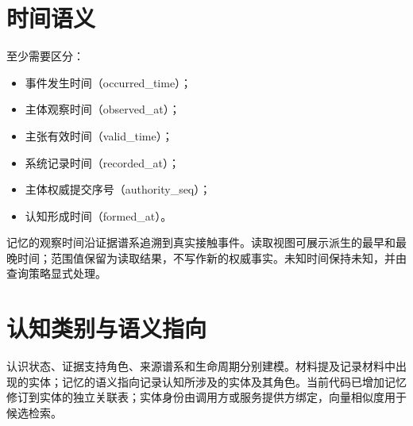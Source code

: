 \section{时间语义}

至少需要区分：

\begin{itemize}
\item 事件发生时间（occurred\allowbreak\_time）；
\item 主体观察时间（observed\allowbreak\_at）；
\item 主张有效时间（valid\allowbreak\_time）；
\item 系统记录时间（recorded\allowbreak\_at）；
\item 主体权威提交序号（authority\allowbreak\_seq）；
\item 认知形成时间（formed\allowbreak\_at）。
\end{itemize}

记忆的观察时间沿证据谱系追溯到真实接触事件。读取视图可展示派生的最早和最晚时间；范围值保留为读取结果，不写作新的权威事实。未知时间保持未知，并由查询策略显式处理。

\section{认知类别与语义指向}

认识状态、证据支持角色、来源谱系和生命周期分别建模。材料提及记录材料中出现的实体；记忆的语义指向记录认知所涉及的实体及其角色。当前代码已增加记忆修订到实体的独立关联表；实体身份由调用方或服务提供方绑定，向量相似度用于候选检索。\cite{nous-research-package,nous-code-snapshot}
